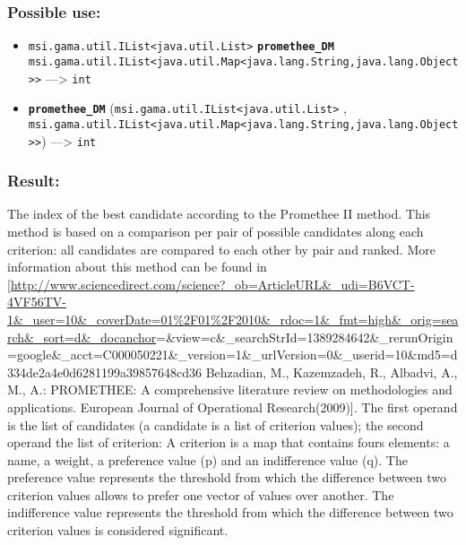\documentclass[]{book}
\providecommand{\tightlist}{%
  \setlength{\itemsep}{0pt}\setlength{\parskip}{0pt}}
\theoremstyle{definition}
\theoremstyle{definition}
\theoremstyle{definition}
\theoremstyle{remark}
\begin{document}
\subsubsection{Possible use:}\label{possible-use-419}

\begin{itemize}
\tightlist
\item
  \texttt{msi.gama.util.IList\textless{}java.util.List\textgreater{}}
  \textbf{\texttt{promethee\_DM}}
  \texttt{msi.gama.util.IList\textless{}java.util.Map\textless{}java.lang.String,java.lang.Object\textgreater{}\textgreater{}}
  ---\textgreater{} \texttt{int}
\item
  \textbf{\texttt{promethee\_DM}}
  (\texttt{msi.gama.util.IList\textless{}java.util.List\textgreater{}} ,
  \texttt{msi.gama.util.IList\textless{}java.util.Map\textless{}java.lang.String,java.lang.Object\textgreater{}\textgreater{}})
  ---\textgreater{} \texttt{int}
\end{itemize}

\subsubsection{Result:}\label{result-405}

The index of the best candidate according to the Promethee II method.
This method is based on a comparison per pair of possible candidates
along each criterion: all candidates are compared to each other by pair
and ranked. More information about this method can be found in
{[}\url{http://www.sciencedirect.com/science?_ob=ArticleURL\&_udi=B6VCT-4VF56TV-1\&_user=10\&_coverDate=01\%2F01\%2F2010\&_rdoc=1\&_fmt=high\&_orig=search\&_sort=d\&_docanchor}=\&view=c\&\_searchStrId=1389284642\&\_rerunOrigin=google\&\_acct=C000050221\&\_version=1\&\_urlVersion=0\&\_userid=10\&md5=d334de2a4e0d6281199a39857648cd36
Behzadian, M., Kazemzadeh, R., Albadvi, A., M., A.: PROMETHEE: A
comprehensive literature review on methodologies and applications.
European Journal of Operational Research(2009){]}. The first operand is
the list of candidates (a candidate is a list of criterion values); the
second operand the list of criterion: A criterion is a map that contains
fours elements: a name, a weight, a preference value (p) and an
indifference value (q). The preference value represents the threshold
from which the difference between two criterion values allows to prefer
one vector of values over another. The indifference value represents the
threshold from which the difference between two criterion values is
considered significant.
\end{document}
